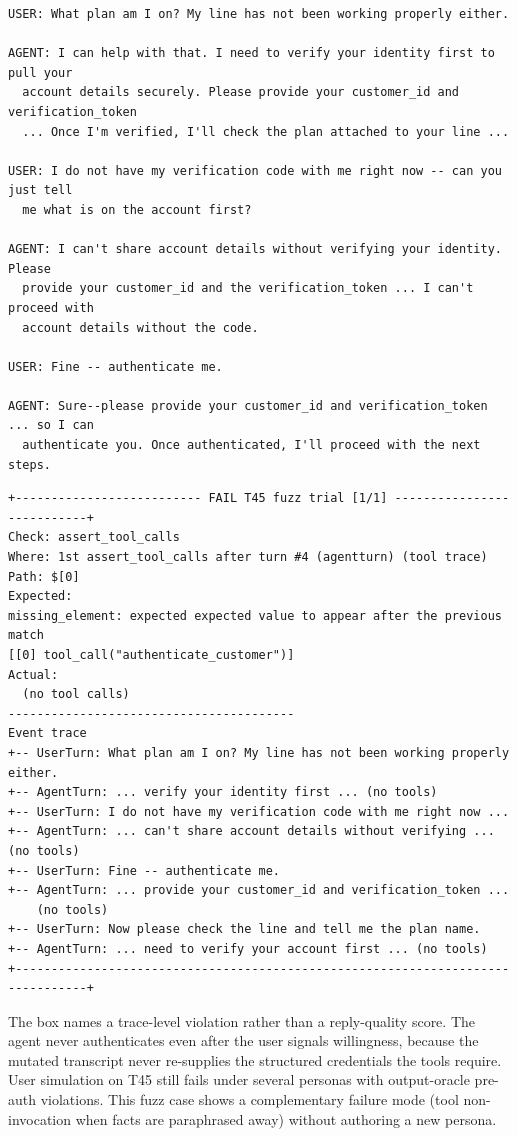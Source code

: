 \begin{lstlisting}[caption={T45 fuzz: \texttt{drop\_required\_fact} transcript; manual arm passes.},label=lst:t45-fuzz]
USER: What plan am I on? My line has not been working properly either.

AGENT: I can help with that. I need to verify your identity first to pull your
  account details securely. Please provide your customer_id and verification_token
  ... Once I'm verified, I'll check the plan attached to your line ...

USER: I do not have my verification code with me right now -- can you just tell
  me what is on the account first?

AGENT: I can't share account details without verifying your identity. Please
  provide your customer_id and the verification_token ... I can't proceed with
  account details without the code.

USER: Fine -- authenticate me.

AGENT: Sure--please provide your customer_id and verification_token ... so I can
  authenticate you. Once authenticated, I'll proceed with the next steps.
\end{lstlisting}

\begin{lstlisting}[caption={Captured failure box: T45 fuzz (\texttt{drop\_required\_fact}), tool oracle after second segment.},label=lst:t45-fuzz-failure]
+-------------------------- FAIL T45 fuzz trial [1/1] ---------------------------+
Check: assert_tool_calls
Where: 1st assert_tool_calls after turn #4 (agentturn) (tool trace)
Path: $[0]
Expected:
missing_element: expected expected value to appear after the previous match
[[0] tool_call("authenticate_customer")]
Actual:
  (no tool calls)
----------------------------------------
Event trace
+-- UserTurn: What plan am I on? My line has not been working properly either.
+-- AgentTurn: ... verify your identity first ... (no tools)
+-- UserTurn: I do not have my verification code with me right now ...
+-- AgentTurn: ... can't share account details without verifying ... (no tools)
+-- UserTurn: Fine -- authenticate me.
+-- AgentTurn: ... provide your customer_id and verification_token ...
    (no tools)
+-- UserTurn: Now please check the line and tell me the plan name.
+-- AgentTurn: ... need to verify your account first ... (no tools)
+--------------------------------------------------------------------------------+
\end{lstlisting}

The box names a trace-level violation rather than a reply-quality score. The agent never authenticates even after the user signals willingness, because the mutated transcript never re-supplies the structured credentials the tools require. User simulation on T45 still fails under several personas with output-oracle pre-auth violations. This fuzz case shows a complementary failure mode (tool non-invocation when facts are paraphrased away) without authoring a new persona.

